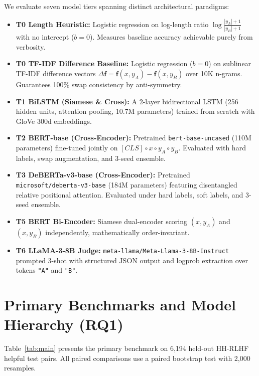 \documentclass[12pt,a4paper]{article}
\begin{document}
We evaluate seven model tiers spanning distinct architectural paradigms:
\begin{itemize}
    \item \textbf{T0 Length Heuristic:} Logistic regression on log-length ratio $\log\frac{|y_A|+1}{|y_B|+1}$ with no intercept ($b = 0$). Measures baseline accuracy achievable purely from verbosity.
    \item \textbf{T0 TF-IDF Difference Baseline:} Logistic regression ($b = 0$) on sublinear TF-IDF difference vectors $\Delta \mathbf{f} = \mathbf{f}(x, y_A) - \mathbf{f}(x, y_B)$ over 10K n-grams. Guarantees 100\% swap consistency by anti-symmetry.
    \item \textbf{T1 BiLSTM (Siamese \& Cross):} A 2-layer bidirectional LSTM (256 hidden units, attention pooling, 10.7M parameters) trained from scratch with GloVe 300d embeddings.
    \item \textbf{T2 BERT-base (Cross-Encoder):} Pretrained \texttt{bert-base-uncased} (110M parameters) fine-tuned jointly on $[CLS] \circ x \circ y_A \circ y_B$. Evaluated with hard labels, swap augmentation, and 3-seed ensemble.
    \item \textbf{T3 DeBERTa-v3-base (Cross-Encoder):} Pretrained \texttt{microsoft/deberta-v3-base} (184M parameters) featuring disentangled relative positional attention. Evaluated under hard labels, soft labels, and 3-seed ensemble.
    \item \textbf{T5 BERT Bi-Encoder:} Siamese dual-encoder scoring $(x, y_A)$ and $(x, y_B)$ independently, mathematically order-invariant.
    \item \textbf{T6 LLaMA-3-8B Judge:} \texttt{meta-llama/Meta-Llama-3-8B-Instruct} prompted 3-shot with structured JSON output and logprob extraction over tokens \texttt{"A"} and \texttt{"B"}.
\end{itemize}

\section{Primary Benchmarks and Model Hierarchy (RQ1)}

Table~\ref{tab:main} presents the primary benchmark on 6,194 held-out HH-RLHF helpful test pairs. All paired comparisons use a paired bootstrap test with 2,000 resamples.
\end{document}

